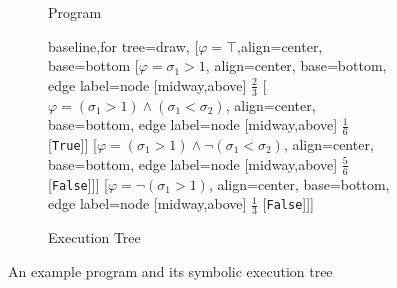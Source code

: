 \begin{figure}[h]
	\centering
	\begin{subfigure}{.3\textwidth}
		\centering
		{\small
			\begin{algorithmic}[1]
				\State{}
				\EndIf
				\Else
				\State{}
				\EndIf
			\end{algorithmic}
		}
		\caption{Program}
		\label{fig:exam_program}
	\end{subfigure}
	\begin{subfigure}{.69\textwidth}
		\centering
		{\small
			\begin{forest}baseline,for tree=draw,
				[{$\varphi=\top$},align=center, base=bottom
				[{$\varphi = \sigma_1 > 1$}, align=center, base=bottom, edge label={node [midway,above] {$\frac{2}{3}$} }
				[{$\varphi = (\sigma_1 > 1) \wedge (\sigma_1 < \sigma_2)$}, align=center, base=bottom, edge label={node [midway,above] {$\frac{1}{6}$} }
				[{\texttt{True}}]]
				[{$\varphi = (\sigma_1 > 1) \wedge \neg(\sigma_1 < \sigma_2)$}, align=center, base=bottom, edge label={node [midway,above] {$\frac{5}{6}$} }
				[{\texttt{False}}]]]
				[{$\varphi = \neg(\sigma_1 > 1)$}, align=center, base=bottom, edge label={node [midway,above] {$\frac{1}{3}$} }
				[{\texttt{False}}]]]
			\end{forest}
		}
		\caption{Execution Tree}
		\label{fig:exam_tree}
		
	\end{subfigure}
	\caption{An example program and its symbolic execution tree}
	\label{fig:example}
\end{figure}


